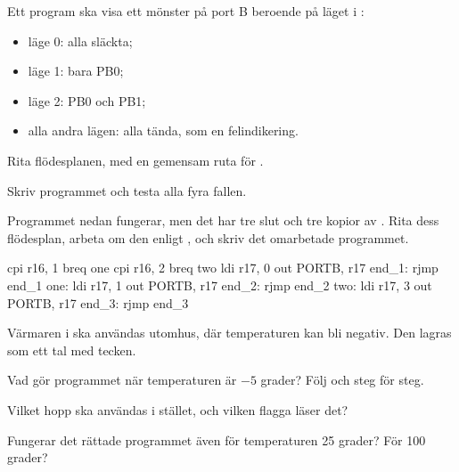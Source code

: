 \label{c9:ex:10}
Ett program ska visa ett mönster på port B beroende på läget i :
\begin{itemize}
  \item läge 0: alla släckta;
  \item läge 1: bara PB0;
  \item läge 2: PB0 och PB1;
  \item alla andra lägen: alla tända, som en felindikering.
\end{itemize}
\begin{parts}
  \item Rita flödesplanen, med en gemensam ruta för .
  \item Skriv programmet och testa alla fyra fallen.
\end{parts}

\label{c9:ex:11}
Programmet nedan fungerar, men det har tre slut och tre kopior av . Rita dess flödesplan,
arbeta om den enligt , och skriv det omarbetade programmet.

\begin{asmcode}
    cpi r16, 1
    breq one
    cpi r16, 2
    breq two
    ldi r17, 0
    out PORTB, r17
end_1:
    rjmp end_1
one:
    ldi r17, 1
    out PORTB, r17
end_2:
    rjmp end_2
two:
    ldi r17, 3
    out PORTB, r17
end_3:
    rjmp end_3
\end{asmcode}

\label{c9:ex:12}
Värmaren i  ska användas utomhus, där temperaturen kan bli negativ. Den lagras som
ett tal med tecken.
\begin{parts}
  \item Vad gör programmet när temperaturen är $-5$ grader? Följ  och  steg
    för steg.
  \item Vilket hopp ska användas i stället, och vilken flagga läser det?
  \item Fungerar det rättade programmet även för temperaturen 25 grader? För 100 grader?
\end{parts}
